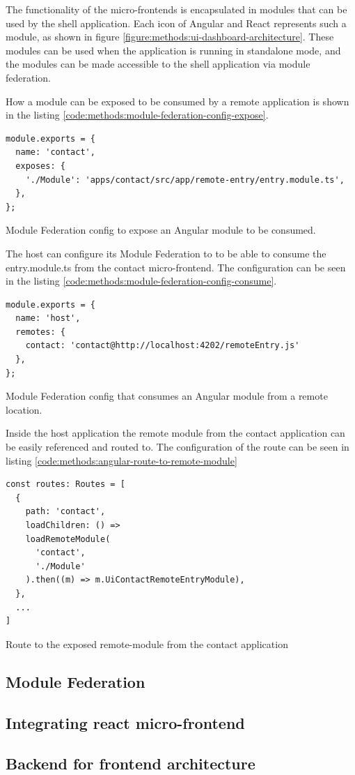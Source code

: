 The functionality of the micro-frontends is encapsulated in modules that can be used by the shell application. Each icon of Angular and React represents such a module, as shown in figure \ref{figure:methods:ui-dashboard-architecture}. These modules can be used when the application is running in standalone mode, and the modules can be made accessible to the shell application via module federation.

How a module can be exposed to be consumed by a remote application is shown in the listing \ref{code:methods:module-federation-config-expose}.

\ifshowListings
\begin{listing}[H]
\begin{verbatim}
module.exports = {
  name: 'contact',
  exposes: {
    './Module': 'apps/contact/src/app/remote-entry/entry.module.ts',
  },
};
\end{verbatim}
\caption{Module Federation config to expose an Angular module to be consumed.}\label{code:methods:module-federation-config-expose}
\end{listing}
\fi

The host can configure its Module Federation to to be able to consume the entry.module.ts from the contact micro-frontend. The configuration can be seen in the listing \ref{code:methods:module-federation-config-consume}.

\ifshowListings
\begin{listing}[H]
\begin{verbatim}
module.exports = {
  name: 'host',
  remotes: {
    contact: 'contact@http://localhost:4202/remoteEntry.js'
  },
};
\end{verbatim}
\caption{Module Federation config that consumes an Angular module from a remote location.}\label{code:methods:module-federation-config-consume}
\end{listing}
\fi

Inside the host application the remote module from the contact application can be easily referenced and routed to. The configuration of the route can be seen in listing \ref{code:methods:angular-route-to-remote-module}

\ifshowListings
\begin{listing}[H]
\begin{verbatim}
const routes: Routes = [
  {
    path: 'contact',
    loadChildren: () =>
    loadRemoteModule(
      'contact',
      './Module'
    ).then((m) => m.UiContactRemoteEntryModule),
  },
  ...
]
\end{verbatim}
\caption{Route to the exposed remote-module from the contact application}\label{code:methods:angular-route-to-remote-module}
\end{listing}
\fi


\subsection{Module Federation}

\subsection{Integrating react micro-frontend}

\subsection{Backend for frontend architecture}